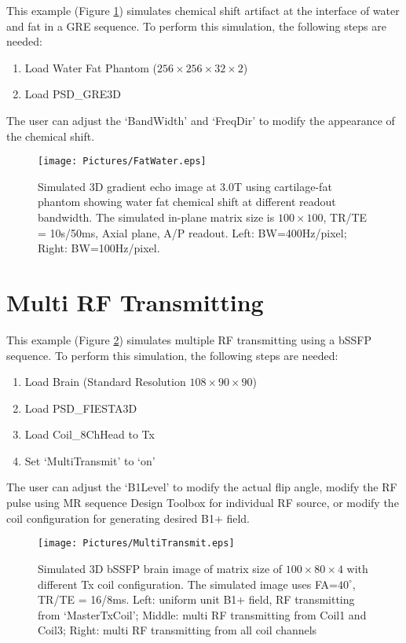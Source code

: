 \documentclass{book}%
\begin{document}
This example (Figure \ref{fig:FatWater}) simulates chemical shift artifact at the interface of water and fat in a GRE sequence. To perform this simulation, the following steps are needed:

\begin{enumerate}
	\item Load Water Fat Phantom ($256 \times 256 \times 32 \times 2$)
  \item Load PSD\_GRE3D
\end{enumerate}

The user can adjust the `BandWidth' and `FreqDir' to modify the appearance of the chemical shift. 

\begin{figure}[htbp]
	\centering
		\texttt{[image: Pictures/FatWater.eps]}
	\caption{Simulated 3D gradient echo image at 3.0T using cartilage-fat phantom showing water fat chemical shift at different readout bandwidth. The simulated in-plane matrix size is $100 \times 100$, TR/TE = 10s/50ms, Axial plane, A/P readout. Left: BW=400Hz/pixel; Right: BW=100Hz/pixel.}
	\label{fig:FatWater}
\end{figure}

\section{Multi RF Transmitting}

This example (Figure \ref{fig:MultiTransmit}) simulates multiple RF transmitting using a bSSFP sequence. To perform this simulation, the following steps are needed:

\begin{enumerate}
	\item Load Brain (Standard Resolution $108 \times 90 \times 90$)
  \item Load PSD\_FIESTA3D
	\item Load Coil\_8ChHead to Tx
	\item Set `MultiTransmit' to `on'
\end{enumerate}

The user can adjust the `B1Level' to modify the actual flip angle, modify the RF pulse using MR sequence Design Toolbox for individual RF source, or modify the coil configuration for generating desired B1+ field.

\begin{figure}[htbp]
	\centering
		\texttt{[image: Pictures/MultiTransmit.eps]}
	\caption{Simulated 3D bSSFP brain image of matrix size of $100 \times 80 \times 4$ with different Tx coil configuration. The simulated image uses FA=$40^{\circ}$, TR/TE = 16/8ms. Left: uniform unit B1+ field, RF transmitting from `MasterTxCoil'; Middle: multi RF transmitting from Coil1 and Coil3; Right: multi RF transmitting from all coil channels}
	\label{fig:MultiTransmit}
\end{figure}
\end{document}
